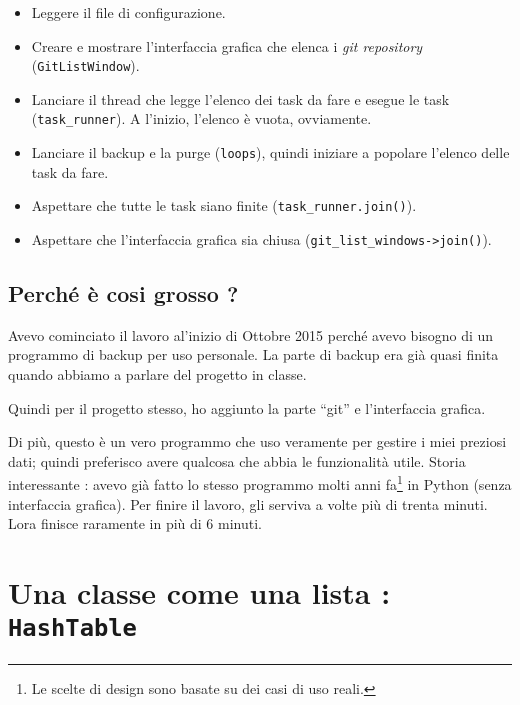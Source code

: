 \documentclass[a4paper,12pt]{article}
\newcommand{\info}[1]{\texttt{#1}}
\begin{document}
\begin{itemize}
    \item Leggere il file di configurazione.
    \item Creare e mostrare l'interfaccia grafica che elenca i \emph{git repository} (\info{GitListWindow}).
    \item Lanciare il thread che legge l'elenco dei task da fare e esegue le task (\info{task\_runner}). A l'inizio, l'elenco è vuota, ovviamente.
    \item Lanciare il backup e la purge (\info{loops}), quindi iniziare a popolare l'elenco delle task da fare.
    \item Aspettare che tutte le task siano finite (\info{task\_runner.join()}).
    \item Aspettare che l'interfaccia grafica sia chiusa (\info{git\_list\_windows->join()}).
\end{itemize}

\subsection{Perché è cosi grosso ?}

Avevo cominciato il lavoro al'inizio di Ottobre 2015 perché avevo bisogno di un programmo di backup per uso personale. La parte di backup era già quasi finita quando abbiamo a parlare del progetto in classe.

Quindi per il progetto stesso, ho aggiunto la parte ``git'' e l'interfaccia grafica.

Di più, questo è un vero programmo che uso veramente per gestire i miei preziosi dati; quindi preferisco avere qualcosa che abbia le funzionalità utile. Storia interessante : avevo già fatto lo stesso programmo molti anni fa\footnote{Le scelte di design sono basate su dei casi di uso reali.} in Python (senza interfaccia grafica). Per finire il lavoro, gli serviva a volte più di trenta minuti. Lora finisce raramente in più di 6 minuti.

\section{Una classe come una lista : \info{HashTable}}
\end{document}

